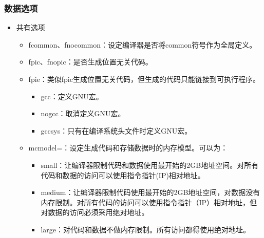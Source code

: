 \documentclass[a4paper,12pt,english]{sphinxmanual}
\begin{document}
\subsubsection{数据选项}
\label{\detokenize{compiler/intel:id11}}\begin{itemize}
\item {} 
\sphinxAtStartPar
共有选项
\begin{itemize}
\item {} 
\sphinxAtStartPar
\sphinxhyphen{}fcommon、\sphinxhyphen{}fno\sphinxhyphen{}common：设定编译器是否将common符号作为全局定义。

\item {} 
\sphinxAtStartPar
\sphinxhyphen{}fpic、\sphinxhyphen{}fno\sphinxhyphen{}pic：是否生成位置无关代码。

\item {} 
\sphinxAtStartPar
\sphinxhyphen{}fpie：类似\sphinxhyphen{}fpic生成位置无关代码，但生成的代码只能链接到可执行程序。
\begin{itemize}
\item {} 
\sphinxAtStartPar
\sphinxhyphen{}gcc：定义GNU宏。

\item {} 
\sphinxAtStartPar
\sphinxhyphen{}no\sphinxhyphen{}gcc：取消定义GNU宏。

\item {} 
\sphinxAtStartPar
\sphinxhyphen{}gcc\sphinxhyphen{}sys：只有在编译系统头文件时定义GNU宏。

\end{itemize}

\item {} 
\sphinxAtStartPar
\sphinxhyphen{}mcmodel=：设定生成代码和存储数据时的内存模型。可以为：
\begin{itemize}
\item {} 
\sphinxAtStartPar
small：让编译器限制代码和数据使用最开始的2GB地址空间。对所有代码和数据的访问可以使用指令指针(IP)相对地址。

\item {} 
\sphinxAtStartPar
medium：让编译器限制代码使用最开始的2GB地址空间，对数据没有内存限制。对所有代码的访问可以使用指令指针（IP）相对地址，但对数据的访问必须采用绝对地址。

\item {} 
\sphinxAtStartPar
large：对代码和数据不做内存限制。所有访问都得使用绝对地址。

\end{itemize}


\end{itemize}
\end{itemize}
\end{document}
